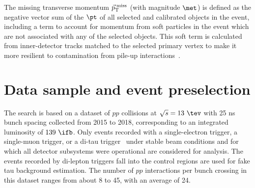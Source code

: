 \documentclass[PAPER, coverpage, atlasdraft=true, texlive=2016, UKenglish]{\ATLASLATEXPATH atlasdoc} %
\begin{document}

The missing transverse momentum $\vec{p}_\textrm{T}^\textrm{\;miss}$ (with magnitude $\met$) is defined as the negative vector sum of the 
$\pt$ of all selected and calibrated objects in the event, including a term to account for momentum from soft particles 
in the event which are not associated with any of the selected objects. 
This soft term is calculated from inner-detector tracks matched to the selected primary vertex to make it more resilient to
contamination from pile-up interactions~\cite{Aaboud:2018tkc}.




\section{Data sample and event preselection}
\label{sec:data_presel}

The search is based on a dataset of $pp$ collisions at $\sqrt{s}=13~\tev$ with 25 ns bunch spacing collected from 2015 to 2018, corresponding to an integrated luminosity of $139~\ifb$.
Only events recorded with a single-electron trigger, a single-muon trigger, or a di-tau trigger~\cite{TRIG-2018-05,TRIG-2018-01,id_trigger,l1topo_trigger} under stable beam conditions 
and for which all detector subsystems were operational are considered for analysis. The events recorded by di-lepton triggers fall into the control regions are used for fake tau background
estimation. The number of $pp$ interactions per bunch crossing in this dataset ranges from about 8 to 45, with an average of 24.
\end{document}
